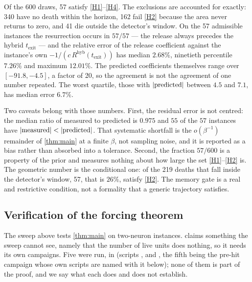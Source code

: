 \documentclass[11pt]{article}
\theoremstyle{definition}
\theoremstyle{remark}
\newcommand{\texit}{t_{\mathrm{exit}}}
\newcommand{\hyb}{\mathrm{hyb}}
\begin{document}
Of the 600 draws, 57 satisfy \eqref{H1}--\eqref{H4}. The exclusions are
accounted for exactly: 340 have no death within the horizon, 162 fail
\eqref{H2} because the area never returns to zero, and 41 die outside the
detector's window. On the 57 admissible instances the resurrection occurs in
$57/57$ --- the release always precedes the hybrid $\texit$ --- and the relative
error of the release coefficient against the instance's own
$-1/(c\,R^{\hyb}(\texit))$ has median $2.68\%$, ninetieth percentile $7.26\%$
and maximum $12.01\%$. The predicted coefficients themselves range over
$[-91.8,-4.5]$, a factor of 20, so the agreement is not the agreement of one
number repeated. The worst quartile, those with $|{\rm predicted}|$ between
$4.5$ and $7.1$, has median error $6.7\%$.

Two caveats belong with those numbers. First, the residual error is not
centred: the median ratio of measured to predicted is $0.975$ and $55$ of the
$57$ instances have $|{\rm measured}|<|{\rm predicted}|$. That systematic
shortfall is the $o(\beta^{-1})$ remainder of \cref{thm:main} at a finite
$\beta$, not sampling noise, and it is reported as a bias rather than absorbed
into a tolerance. Second, the fraction $57/600$ is a property of the prior and
measures nothing about how large the set \eqref{H1}--\eqref{H2} is. The
geometric number is the conditional one: of the 219 deaths that fall inside the
detector's window, 57, that is $26\%$, satisfy \eqref{H2}. The memory gate is a
real and restrictive condition, not a formality that a generic trajectory
satisfies.

\subsection{Verification of the forcing theorem}\label{sec:forcing-numerics}

The sweep above tests \cref{thm:main} on two-neuron instances. 
claims something the sweep cannot see, namely that the number of live units does
nothing, so it needs its own campaigns. Five were run, in
 (scripts ,
 and , the fifth being the pre-hit campaign
whose own scripts are named with it below); none of them is part of the proof,
and we say what each does and does not establish.
\end{document}
